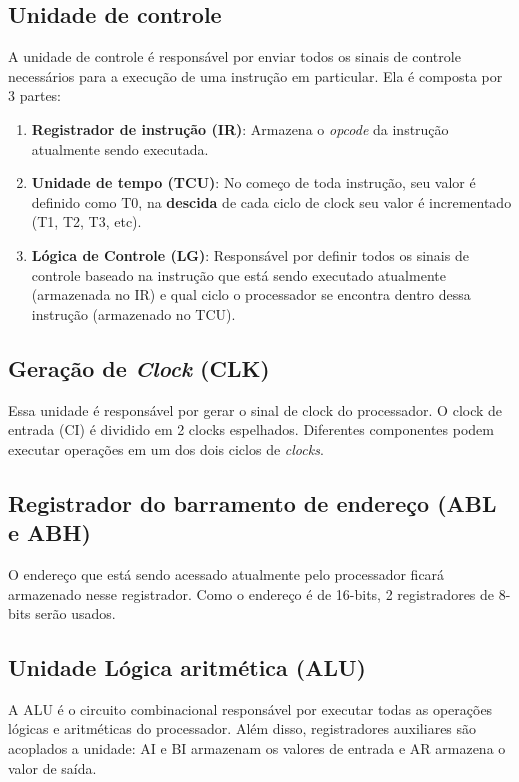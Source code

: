 \documentclass[
	12pt,				  %
	openright,		%
	a4paper,			%
	english,			%
	french,				%
	spanish,			%
	brazil,				%
]{abntex2}
\begin{document}
\subsection{Unidade de controle}
A unidade de controle é responsável por enviar todos os sinais de controle
necessários para a execução de uma instrução em particular. Ela é composta por 3
partes:
\begin{enumerate}
	\item \textbf{Registrador de instrução (IR)}: Armazena o \emph{opcode} da
	      instrução atualmente sendo executada.
	\item \textbf{Unidade de tempo (TCU)}: No começo de toda instrução, seu valor
	      é definido como T0, na \textbf{descida} de cada ciclo de clock seu valor é
	      incrementado (T1, T2, T3, etc).
	\item \textbf{Lógica de Controle (LG)}: Responsável por definir todos os
	      sinais de controle baseado na instrução que está sendo executado atualmente
	      (armazenada no IR) e qual ciclo o processador se encontra dentro dessa
	      instrução (armazenado no TCU).
\end{enumerate}

\subsection{Geração de \emph{Clock} (CLK)}
Essa unidade é responsável por gerar o sinal de clock do processador. O clock de
entrada (CI) é dividido em 2 clocks espelhados. Diferentes componentes podem
executar operações em um dos dois ciclos de \emph{clocks}.

\subsection{Registrador do barramento de endereço (ABL e ABH)}
O endereço que está sendo acessado atualmente pelo processador ficará armazenado
nesse registrador. Como o endereço é de 16-bits, 2 registradores de 8-bits serão
usados.

\subsection{Unidade Lógica aritmética (ALU)}
A ALU é o circuito combinacional responsável por executar todas as operações
lógicas e aritméticas do processador. Além disso, registradores auxiliares são
acoplados a unidade: AI e BI armazenam os valores de entrada e AR armazena o
valor de saída.
\end{document}

